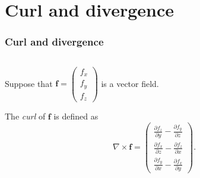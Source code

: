 \documentclass[aspectratio=169]{beamer}
\newcommand{\ff}{\mathbf{f}}
\begin{document}
\section{Curl and divergence}

\begin{frame}
    \frametitle{Curl and divergence}

    \begin{columns}
        \begin{column}{.5\textwidth}
            Suppose that \(\ff = \left(\begin{smallmatrix}
                    f_x \\ f_y \\ f_z
                \end{smallmatrix}\right)\)
            is a vector field.

            \begin{definition}[curl]
                The \emph{curl} of \(\ff\) is defined as
                \[
                    \nabla \times \ff = \begin{pmatrix}
                        \frac{\partial f_z}{\partial y} - \frac{\partial f_y}{\partial z} \\[.5em]
                        \frac{\partial f_x}{\partial z} - \frac{\partial f_z}{\partial x} \\[.5em]
                        \frac{\partial f_y}{\partial x} - \frac{\partial f_x}{\partial y}
                    \end{pmatrix}.
                \]
            \end{definition}


\end{column}
\end{columns}
\end{frame}
\end{document}
